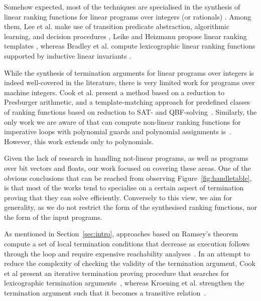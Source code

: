 \documentclass[preprint]{sigplanconf}
\theoremstyle{definition}
\begin{document}
Somehow expected, most of the techniques are specialised in the synthesis of linear ranking functions for linear programs 
over integers (or rationals) \cite{DBLP:conf/pldi/CookPR06,DBLP:conf/cav/LeeWY12,DBLP:conf/popl/Ben-AmramG13,DBLP:conf/vmcai/P04,
DBLP:conf/atva/HeizmannHLP13,DBLP:conf/cav/BradleyMS05,DBLP:conf/tacas/CookSZ13,DBLP:conf/cav/KroeningSTW10}. Among them, 
Lee et al. make use of transition predicate abstraction, algorithmic learning, and decision procedures 
\cite{DBLP:conf/cav/LeeWY12},
Leike and Heizmann propose linear ranking templates 
\cite{DBLP:conf/tacas/LeikeH14}, whereas
Bradley et al. compute lexicographic linear ranking functions supported by inductive linear invariants 
\cite{DBLP:conf/cav/BradleyMS05}. 


While the synthesis of termination arguments for linear programs over
integers is indeed well-covered in the literature, there is very limited
work for programs over machine integers.  Cook et al.  present a method
based on a reduction to Presburger arithmetic, and a template-matching
approach for predefined classes of ranking functions based on reduction to
SAT- and QBF-solving~\cite{DBLP:conf/tacas/CookKRW10}.  Similarly, the only
work we are aware of that can compute non-linear ranking functions for
imperative loops with polynomial guards and polynomial assignments
is~\cite{DBLP:conf/vmcai/BradleyMS05}.  However, this work extends only to
polynomials.

Given the lack of research in handling not-linear programs, as well
as programs over bit vectors and floats, our work focused on covering
these areas.  One of the obvious conclusions that can be reached from
observing Figure~\ref{fig:handletable}, is that most of the works tend to
specialise on a certain aspect of termination proving that they can solve
efficiently.  Conversely to this view, we aim for generality, as we
do not restrict the form of the synthesised ranking functions, nor the form
of the input programs.

As mentioned in Section~\ref{sec:intro}, approaches based on Ramsey's
theorem compute a set of local termination conditions that decrease as
execution follows through the loop and require expensive reachability
analyses~\cite{DBLP:conf/lpe/CodishG03,DBLP:conf/lics/PodelskiR04,DBLP:conf/pldi/CookPR06}. 
In an attempt to reduce the complexity of checking the validity of the
termination argument, Cook et al present an iterative termination proving
procedure that searches for lexicographic termination
arguments~\cite{DBLP:conf/tacas/CookSZ13}, whereas Kroening et al. 
strengthen the termination argument such that it becomes a transitive
relation~\cite{DBLP:conf/cav/KroeningSTW10}.
\end{document}
